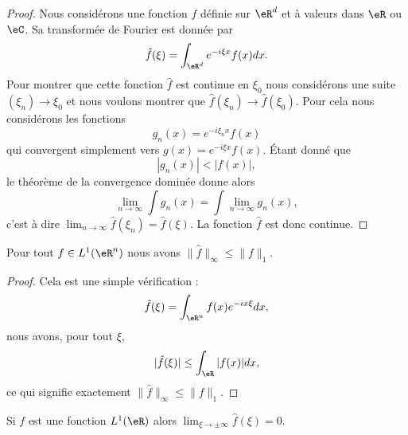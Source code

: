 \begin{proof}
    Nous considérons une fonction \( f\) définie sur \( \eR^d\) et à valeurs dans \( \eR\) ou \( \eC\). Sa transformée de Fourier est donnée par
    \begin{equation}
        \hat f(\xi)=\int_{\eR^d} e^{-i\xi x}f(x)dx.
    \end{equation}
    Pour montrer que cette fonction \( \hat f\) est continue en \( \xi_0\) nous considérons une suite \( (\xi_n)\to \xi_0\) et nous voulons montrer que \( \hat f(\xi_n)\to\hat f(\xi_0)\). Pour cela nous considérons les fonctions
\begin{equation}
    g_n(x)= e^{-i\xi_nx}f(x)
\end{equation}
qui convergent simplement vers \( g(x)= e^{-i\xi x}f(x)\). Étant donné que
\begin{equation}
    | g_n(x) |<| f(x) |,
\end{equation}
le théorème de la convergence dominée donne alors
\begin{equation}
    \lim_{n\to \infty} \int g_n(x)=\int\lim_{n\to \infty } g_n(x),
\end{equation}
c'est à dire \( \lim_{n\to \infty} \hat f(\xi_n)=\hat f(\xi)\). La fonction \( \hat f\) est donc continue.
\end{proof}

\begin{lemma}       \label{LEMooCBPTooYlcbrR}
    Pour tout \( f\in L^1(\eR^n)\) nous avons \( \| \hat f \|_{\infty}\leq \| f \|_1\).
\end{lemma}

\begin{proof}
    Cela est une simple vérification :
    \begin{equation}
        \hat f(\xi)=\int_{\eR^n}f(x) e^{-ix\xi}dx,
    \end{equation}
    nous avons, pour tout \( \xi\),
    \begin{equation}
        | \hat f(\xi) |\leq\int_{\eR}| f(x) |dx,
    \end{equation}
    ce qui signifie exactement \( \| \hat f \|_{\infty}\leq \| f \|_1\).
\end{proof}

\begin{lemma}     \label{LesmRLaxXkQV}
    Si \( f\) est une fonction \( L^1(\eR)\) alors \( \lim_{\xi\to\pm\infty} \hat f(\xi)=0\).
\end{lemma}

